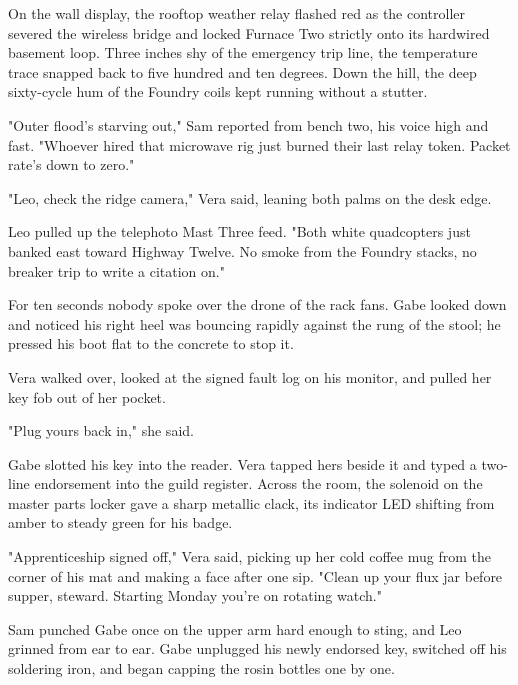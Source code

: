 On the wall display, the rooftop weather relay flashed red as the controller severed the wireless bridge and locked Furnace Two strictly onto its hardwired basement loop. Three inches shy of the emergency trip line, the temperature trace snapped back to five hundred and ten degrees. Down the hill, the deep sixty-cycle hum of the Foundry coils kept running without a stutter.

"Outer flood's starving out," Sam reported from bench two, his voice high and fast. "Whoever hired that microwave rig just burned their last relay token. Packet rate's down to zero."

"Leo, check the ridge camera," Vera said, leaning both palms on the desk edge.

Leo pulled up the telephoto Mast Three feed. "Both white quadcopters just banked east toward Highway Twelve. No smoke from the Foundry stacks, no breaker trip to write a citation on."

For ten seconds nobody spoke over the drone of the rack fans. Gabe looked down and noticed his right heel was bouncing rapidly against the rung of the stool; he pressed his boot flat to the concrete to stop it.

Vera walked over, looked at the signed fault log on his monitor, and pulled her key fob out of her pocket.

"Plug yours back in," she said.

Gabe slotted his key into the reader. Vera tapped hers beside it and typed a two-line endorsement into the guild register. Across the room, the solenoid on the master parts locker gave a sharp metallic clack, its indicator LED shifting from amber to steady green for his badge.

"Apprenticeship signed off," Vera said, picking up her cold coffee mug from the corner of his mat and making a face after one sip. "Clean up your flux jar before supper, steward. Starting Monday you're on rotating watch."

Sam punched Gabe once on the upper arm hard enough to sting, and Leo grinned from ear to ear. Gabe unplugged his newly endorsed key, switched off his soldering iron, and began capping the rosin bottles one by one.
